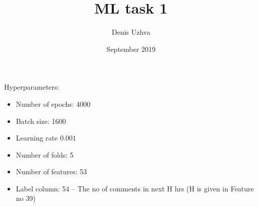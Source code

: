\documentclass{article}
\begin{document}
\title{ML task 1}
\author{Denis Uzhva}
\date{September 2019}
\maketitle

Hyperparameters:
\begin{itemize}
    \item Number of epochs: 4000
    \item Batch size: 1600
    \item Learning rate $0.001$
    \item Number of folds: 5
    \item Number of features: 53
    \item Label column: 54 -- The no of comments in next H hrs (H is given in Feature no 39)
\end{itemize}
\end{document}
